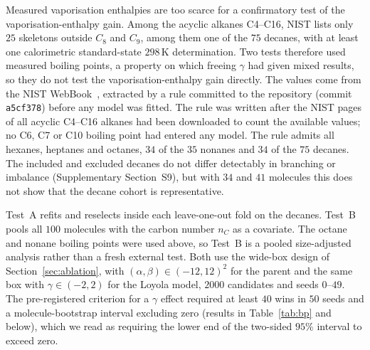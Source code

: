 \documentclass[a5paper, 10pt]{article}
\theoremstyle{plain}
\theoremstyle{remark}
\theoremstyle{definition}
\begin{document}
Measured vaporisation enthalpies are too scarce for a confirmatory test
of the vaporisation-enthalpy gain. Among
the acyclic alkanes C4--C16, NIST lists only $25$ skeletons outside $C_8$
and $C_9$, among them one of the $75$ decanes, with at least one calorimetric standard-state
$298$\,K determination. Two tests therefore used measured boiling
points, a property on which freeing $\gamma$ had given mixed results, so
they do not test the vaporisation-enthalpy gain directly. The values come
from the NIST WebBook~\cite{NISTWebBook}, extracted by a rule
committed to the repository (commit \texttt{a5cf378}) before any model
was fitted. The rule was written after the NIST pages of all acyclic
C4--C16 alkanes had been downloaded to count the available values; no
C6, C7 or C10 boiling point had entered any model. The rule admits all hexanes, heptanes and octanes, $34$ of
the $35$ nonanes and $34$ of the $75$ decanes. The included and
excluded decanes do not differ detectably in branching or imbalance
(Supplementary Section~S9), but with $34$ and $41$ molecules this does
not show that the decane cohort is representative.

Test~A refits and
reselects inside each leave-one-out fold on the decanes. Test~B pools
all $100$ molecules with the carbon number $n_C$ as a covariate. The
octane and nonane boiling points were used above, so Test~B is a pooled
size-adjusted analysis rather than a fresh external test. Both use the
wide-box design of Section~\ref{sec:ablation}, with
$(\alpha,\beta) \in (-12,12)^2$ for the parent and the same box with
$\gamma \in (-2,2)$ for the Loyola model, $2000$ candidates and seeds
$0$--$49$. The pre-registered criterion for a $\gamma$ effect required
at least $40$ wins in $50$ seeds and a molecule-bootstrap interval
excluding zero (results in Table~\ref{tab:bp} and below), which we read as requiring the lower end of the two-sided $95\%$ interval to exceed zero.
\end{document}
